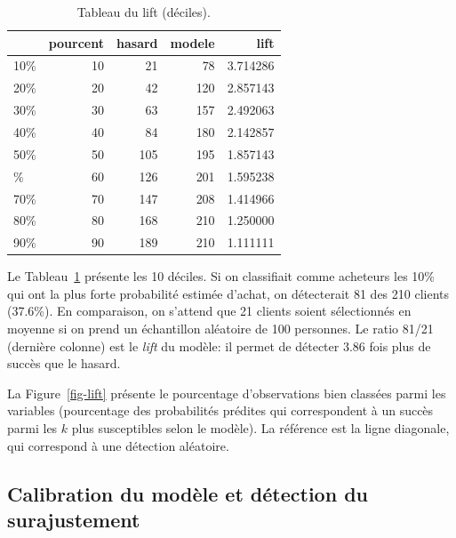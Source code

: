 \documentclass[
  11pt,
  letterpaper,
]{book}
\theoremstyle{definition}
\theoremstyle{remark}
\begin{document}
\hypertarget{tbl-lift}{}
\begin{table}
\caption{\label{tbl-lift}Tableau du lift (déciles). }\tabularnewline

\centering
\begin{tabular}{lrrrr}
\toprule
  & pourcent & hasard & modele & lift\\
\midrule
10\% & 10 & 21 & 78 & 3.714286\\
20\% & 20 & 42 & 120 & 2.857143\\
30\% & 30 & 63 & 157 & 2.492063\\
40\% & 40 & 84 & 180 & 2.142857\\
50\% & 50 & 105 & 195 & 1.857143\\
\addlinespace
60\% & 60 & 126 & 201 & 1.595238\\
70\% & 70 & 147 & 208 & 1.414966\\
80\% & 80 & 168 & 210 & 1.250000\\
90\% & 90 & 189 & 210 & 1.111111\\
\bottomrule
\end{tabular}
\end{table}

Le Tableau~\ref{tbl-lift} présente les 10 déciles. Si on classifiait
comme acheteurs les 10\% qui ont la plus forte probabilité estimée
d'achat, on détecterait 81 des 210 clients (37.6\%). En comparaison, on
s'attend que 21 clients soient sélectionnés en moyenne si on prend un
échantillon aléatoire de 100 personnes. Le ratio 81/21 (dernière
colonne) est le \emph{lift} du modèle: il permet de détecter 3.86 fois
plus de succès que le hasard.

La Figure~\ref{fig-lift} présente le pourcentage d'observations bien
classées parmi les variables (pourcentage des probabilités prédites qui
correspondent à un succès parmi les \(k\) plus susceptibles selon le
modèle). La référence est la ligne diagonale, qui correspond à une
détection aléatoire.

\hypertarget{calibration-du-moduxe8le-et-duxe9tection-du-surajustement}{%
\subsection{Calibration du modèle et détection du
surajustement}\label{calibration-du-moduxe8le-et-duxe9tection-du-surajustement}}
\end{document}
